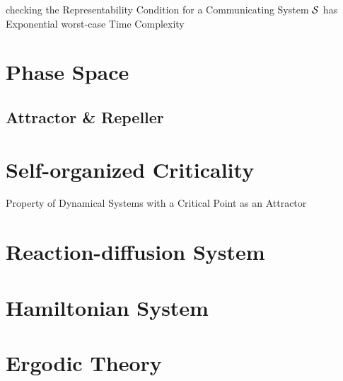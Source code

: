 checking the Representability Condition for a Communicating System
$\mathcal{S}$ has Exponential worst-case Time Complexity


\endgroup



\section{Phase Space}\label{sec:phase_space}

\subsection{Attractor \& Repeller}\label{sec:attractor_repeller}



\section{Self-organized Criticality}\label{sec:self_organized_criticality}

Property of Dynamical Systems with a Critical Point as an Attractor




\section{Reaction-diffusion System}\label{sec:reaction_diffusion}

\section{Hamiltonian System}\label{sec:hamiltonian_system}

\section{Ergodic Theory}\label{sec:ergodic_theory}

